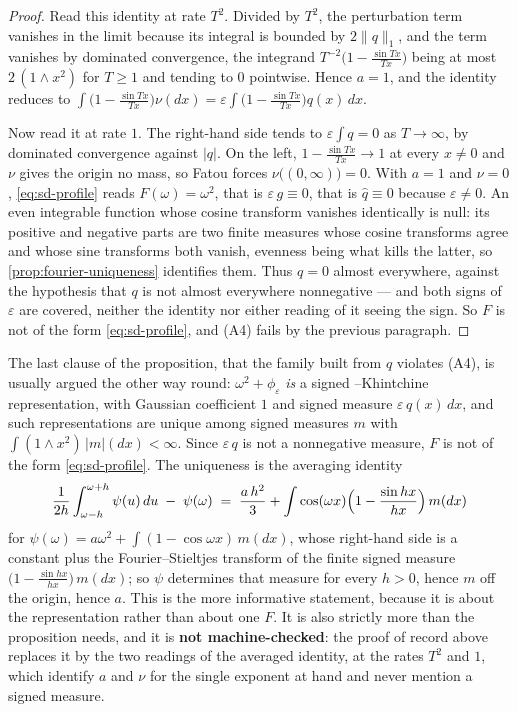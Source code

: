 \begin{proof}
Read this identity at rate $T^2$. Divided by $T^2$, the perturbation term vanishes in the limit
because its integral is bounded by $2\|q\|_1$, and the \Levy{} term vanishes by dominated
convergence, the integrand $T^{-2}\bigl(1 - \frac{\sin Tx}{Tx}\bigr)$ being at most
$2\,(1 \wedge x^2)$ for $T \ge 1$ and tending to $0$ pointwise. Hence $a = 1$, and the identity
reduces to
$\int \bigl(1 - \frac{\sin Tx}{Tx}\bigr)\nu(dx)
 = \varepsilon\int \bigl(1 - \frac{\sin Tx}{Tx}\bigr) q(x)\,dx$.

Now read it at rate $1$. The right-hand side tends to $\varepsilon \int q = 0$ as
$T \to \infty$, by dominated convergence against $|q|$. On the left,
$1 - \frac{\sin Tx}{Tx} \to 1$ at every $x \ne 0$ and $\nu$ gives the origin no mass, so Fatou
forces $\nu\bigl((0,\infty)\bigr) = 0$. With $a = 1$ and $\nu = 0$, \ref{eq:sd-profile} reads
$F(\omega) = \omega^2$, that is $\varepsilon\,g \equiv 0$, that is $\hat q \equiv 0$ because
$\varepsilon \ne 0$. An even integrable function whose cosine transform vanishes identically is
null: its positive and negative parts are two finite measures whose cosine transforms agree and
whose sine transforms both vanish, evenness being what kills the latter, so
\ref{prop:fourier-uniqueness} identifies them. Thus $q = 0$ almost everywhere, against the
hypothesis that $q$ is not almost everywhere nonnegative --- and both signs of $\varepsilon$
are covered, neither the identity nor either reading of it seeing the sign. So $F$ is not of
the form \ref{eq:sd-profile}, and (A4) fails by the previous paragraph.
\end{proof}

\begin{remark}\label{rem:signed-levy-uniqueness}
The last clause of the proposition, that the family built from $q$ violates (A4), is usually
argued the other way round: $\omega^2 + \phi_\varepsilon$ \emph{is} a
signed \Levy--Khintchine representation, with Gaussian coefficient $1$ and signed measure
$\varepsilon\,q(x)\,dx$, and such representations are unique among signed measures $m$ with
$\int (1 \wedge x^2)\,|m|(dx) < \infty$. Since $\varepsilon\,q$ is not a nonnegative measure,
$F$ is not of the form \ref{eq:sd-profile}. The uniqueness is the averaging identity
\[
  \frac{1}{2h}\int_{\omega-h}^{\omega+h}\psi(u)\,du \;-\; \psi(\omega)
  \;=\; \frac{a\,h^2}{3}
   + \int \cos(\omega x)\Bigl(1 - \frac{\sin hx}{hx}\Bigr)\,m(dx)
\]
for $\psi(\omega) = a\omega^2 + \int (1-\cos\omega x)\,m(dx)$, whose right-hand side is a
constant plus the Fourier--Stieltjes transform of the finite signed measure
$\bigl(1 - \frac{\sin hx}{hx}\bigr)\,m(dx)$; so $\psi$ determines that measure for every
$h > 0$, hence $m$ off the origin, hence $a$. This is the more informative statement, because
it is about the representation rather than about one $F$. It is
also strictly more than the proposition needs, and it is \textbf{not machine-checked}: the
proof of record above replaces it by the two readings of the averaged identity, at the rates
$T^2$ and $1$, which identify $a$ and $\nu$
for the single exponent at hand and never mention a signed measure.
\end{remark}

